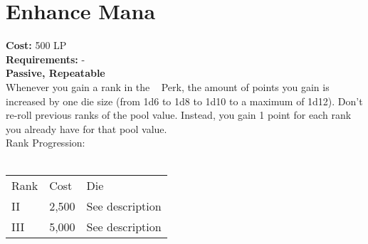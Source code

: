 \section{Enhance Mana}\label{sec:enhanceMana}
\textbf{Cost:} 500 LP\\
\textbf{Requirements:} -\\
\textbf{Passive, Repeatable}\\
Whenever you gain a rank in the ~ Perk, the amount of points you gain is increased by one die size (from 1d6 to 1d8 to 1d10 to a maximum of 1d12).
Don't re-roll previous ranks of the pool value.
Instead, you gain 1 point for each rank you already have for that pool value.
\\
Rank Progression:\\
\\
\begin{tabular}{l | l | p{12cm} }
    Rank & Cost & Die\\
    II & 2,500 & See description \\
    III & 5,000 & See description \\
\end{tabular}